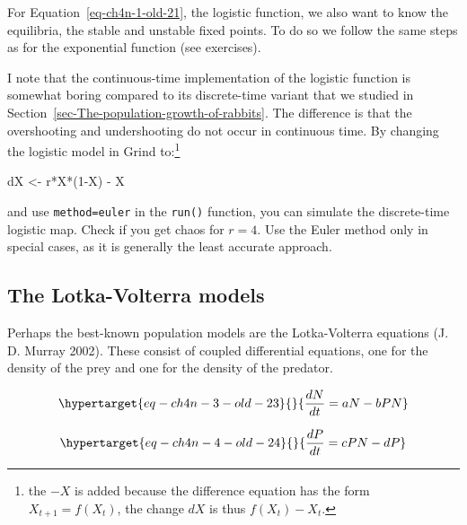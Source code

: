 \documentclass[
  a4paper,
  DIV=11,
  numbers=noendperiod]{scrreprt}
\newenvironment{Shaded}{\begin{snugshade}}{\end{snugshade}}
\newcommand{\DecValTok}[1]{\textcolor[rgb]{0.68,0.00,0.00}{#1}}
\newcommand{\NormalTok}[1]{\textcolor[rgb]{0.00,0.23,0.31}{#1}}
\newcommand{\OtherTok}[1]{\textcolor[rgb]{0.00,0.23,0.31}{#1}}
\newcommand{\SpecialCharTok}[1]{\textcolor[rgb]{0.37,0.37,0.37}{#1}}
\begin{document}
For Equation~\ref{eq-ch4n-1-old-21}, the logistic function, we also want
to know the equilibria, the stable and unstable fixed points. To do so
we follow the same steps as for the exponential function (see
exercises).

I note that the continuous-time implementation of the logistic function
is somewhat boring compared to its discrete-time variant that we studied
in Section~\ref{sec-The-population-growth-of-rabbits}. The difference is
that the overshooting and undershooting do not occur in continuous time.
By changing the logistic model in Grind to:\footnote{the \(-X\) is added
  because the difference equation has the form \(X_{t + 1} = f(X_{t})\),
  the change \(dX\) is thus \(f(X_{t})-X_{t}\).}

\begin{Shaded}
\begin{Highlighting}[]
\NormalTok{dX }\OtherTok{\textless{}{-}}\NormalTok{ r}\SpecialCharTok{*}\NormalTok{X}\SpecialCharTok{*}\NormalTok{(}\DecValTok{1}\SpecialCharTok{{-}}\NormalTok{X) }\SpecialCharTok{{-}}\NormalTok{ X }
\end{Highlighting}
\end{Shaded}

and use \texttt{method=\textquotesingle{}euler\textquotesingle{}} in the
\texttt{run()} function, you can simulate the discrete-time logistic
map. Check if you get chaos for \(r = 4\). Use the Euler method only in
special cases, as it is generally the least accurate approach.

\hypertarget{sec-The-LotkaVolterra-models}{%
\subsection{The Lotka-Volterra
models}\label{sec-The-LotkaVolterra-models}}

Perhaps the best-known population models are the Lotka-Volterra
equations (J. D. Murray 2002). These consist of coupled differential
equations, one for the density of the prey and one for the density of
the predator.

\begin{equation}\protect\hypertarget{eq-ch4n-3-old-23}{}{
\frac{dN}{dt} = aN - bPN
}\label{eq-ch4n-3-old-23}\end{equation}

\begin{equation}\protect\hypertarget{eq-ch4n-4-old-24}{}{
\frac{dP}{dt} = cPN - dP
}\label{eq-ch4n-4-old-24}\end{equation}
\end{document}
